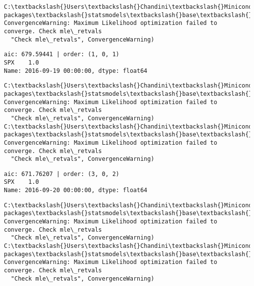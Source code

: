 \documentclass[11pt]{article}
\begin{document}
    \begin{Verbatim}[commandchars=\\\{\}]
C:\textbackslash{}Users\textbackslash{}Chandini\textbackslash{}Miniconda3\textbackslash{}envs\textbackslash{}auquan\textbackslash{}lib\textbackslash{}site-packages\textbackslash{}statsmodels\textbackslash{}base\textbackslash{}model.py:496: ConvergenceWarning: Maximum Likelihood optimization failed to converge. Check mle\_retvals
  "Check mle\_retvals", ConvergenceWarning)

    \end{Verbatim}

    \begin{Verbatim}[commandchars=\\\{\}]
aic: 679.59441 | order: (1, 0, 1)
SPX    1.0
Name: 2016-09-19 00:00:00, dtype: float64

    \end{Verbatim}

    \begin{Verbatim}[commandchars=\\\{\}]
C:\textbackslash{}Users\textbackslash{}Chandini\textbackslash{}Miniconda3\textbackslash{}envs\textbackslash{}auquan\textbackslash{}lib\textbackslash{}site-packages\textbackslash{}statsmodels\textbackslash{}base\textbackslash{}model.py:496: ConvergenceWarning: Maximum Likelihood optimization failed to converge. Check mle\_retvals
  "Check mle\_retvals", ConvergenceWarning)
C:\textbackslash{}Users\textbackslash{}Chandini\textbackslash{}Miniconda3\textbackslash{}envs\textbackslash{}auquan\textbackslash{}lib\textbackslash{}site-packages\textbackslash{}statsmodels\textbackslash{}base\textbackslash{}model.py:496: ConvergenceWarning: Maximum Likelihood optimization failed to converge. Check mle\_retvals
  "Check mle\_retvals", ConvergenceWarning)

    \end{Verbatim}

    \begin{Verbatim}[commandchars=\\\{\}]
aic: 671.76207 | order: (3, 0, 2)
SPX    1.0
Name: 2016-09-20 00:00:00, dtype: float64

    \end{Verbatim}

    \begin{Verbatim}[commandchars=\\\{\}]
C:\textbackslash{}Users\textbackslash{}Chandini\textbackslash{}Miniconda3\textbackslash{}envs\textbackslash{}auquan\textbackslash{}lib\textbackslash{}site-packages\textbackslash{}statsmodels\textbackslash{}base\textbackslash{}model.py:496: ConvergenceWarning: Maximum Likelihood optimization failed to converge. Check mle\_retvals
  "Check mle\_retvals", ConvergenceWarning)
C:\textbackslash{}Users\textbackslash{}Chandini\textbackslash{}Miniconda3\textbackslash{}envs\textbackslash{}auquan\textbackslash{}lib\textbackslash{}site-packages\textbackslash{}statsmodels\textbackslash{}base\textbackslash{}model.py:496: ConvergenceWarning: Maximum Likelihood optimization failed to converge. Check mle\_retvals
  "Check mle\_retvals", ConvergenceWarning)

    \end{Verbatim}
\end{document}
